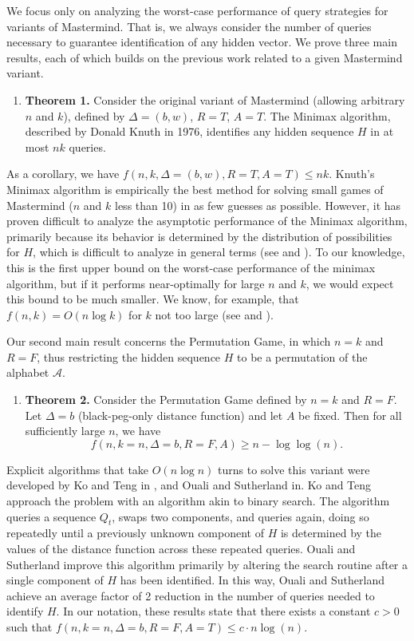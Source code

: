 \documentclass[12pt, a4paper]{article}
\begin{document}
We focus only on analyzing the worst-case performance of query strategies for variants of Mastermind. That is, we always consider the number of queries necessary to guarantee identification of any hidden vector. We prove three main results, each of which builds on the previous work related to a given Mastermind variant.
\begin{enumerate}[label=]
	\item\textbf{Theorem 1.} Consider the original variant of Mastermind (allowing arbitrary $n$ and $k$), defined by $\Delta=(b, w)$, $R=T$, $A=T$. The Minimax algorithm, described by Donald Knuth in 1976, identifies any hidden sequence $H$ in at most $nk$ queries.
\end{enumerate}
As a corollary, we have $f(n, k, \Delta=(b,w), R=T, A=T)\le nk$. Knuth's Minimax algorithm is empirically the best method for solving small games of Mastermind ($n$ and $k$ less than 10) in as few guesses as possible. However, it has proven difficult to analyze the asymptotic performance of the Minimax algorithm, primarily because its behavior is determined by the distribution of possibilities for $H$, which is difficult to analyze in general terms (see \cite{KT86} and \cite{OS13}). To our knowledge, this is the first upper bound on the worst-case performance of the minimax algorithm, but if it performs near-optimally for large $n$ and $k$, we would expect this bound to be much smaller. We know, for example, that $f(n,k) = O(n \log k)$ for $k$ not too large (see \cite{DK76} and \cite{KT86}).

Our second main result concerns the Permutation Game, in which $n=k$ and $R=F$, thus restricting the hidden sequence $H$ to be a permutation of the alphabet $\mathcal{A}$.
\begin{enumerate}[label=]
	\item\textbf{Theorem 2.} Consider the Permutation Game defined by $n = k$ and $R = F$. Let $\Delta = b$ (black-peg-only distance function) and let $A$ be fixed. Then for all sufficiently large $n$, we have
	\begin{equation*}
		f(n, k = n, \Delta = b, R = F, A) \ge n - \log\log(n).
	\end{equation*}
\end{enumerate}
Explicit algorithms that take $O(n \log n)$ turns to solve this variant were developed by Ko and Teng in \cite{KT86}, and Ouali and Sutherland in\cite{OS13}. Ko and Teng approach the problem with an algorithm akin to binary search. The algorithm queries a sequence $Q_t$, swaps two components, and queries again, doing so repeatedly until a previously unknown component of $H$ is determined by the values of the distance function across these repeated queries. Ouali and Sutherland improve this algorithm primarily by altering the search routine after a single component of $H$ has been identified. In this way, Ouali and Sutherland achieve an average factor of 2 reduction in the number of queries needed to identify $H$. In our notation, these results state that there exists a constant $c>0$ such that $f(n, k=n, \Delta=b, R = F, A = T)\le c\cdot n\log(n)$.
\end{document}
